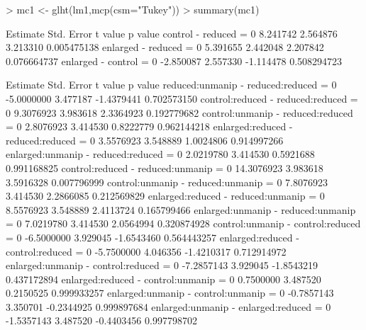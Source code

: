 \documentclass[a4paper]{article}
\begin{document}
\begin{Schunk}
\begin{Sinput}
> mc1 <- glht(lm1,mcp(csm="Tukey"))
> summary(mc1)
\end{Sinput}
\end{Schunk}
\begin{Schunk}
\begin{Soutput}
                        Estimate Std. Error   t value     p value
control - reduced = 0   8.241742   2.564876  3.213310 0.005475138
enlarged - reduced = 0  5.391655   2.442048  2.207842 0.076664737
enlarged - control = 0 -2.850087   2.557330 -1.114478 0.508294723
\end{Soutput}
\end{Schunk}
\begin{Schunk}
\end{Schunk}
\begin{Schunk}
\begin{Soutput}
                                          Estimate Std. Error    t value     p value
reduced:unmanip - reduced:reduced = 0   -5.0000000   3.477187 -1.4379441 0.702573150
control:reduced - reduced:reduced = 0    9.3076923   3.983618  2.3364923 0.192779682
control:unmanip - reduced:reduced = 0    2.8076923   3.414530  0.8222779 0.962144218
enlarged:reduced - reduced:reduced = 0   3.5576923   3.548889  1.0024806 0.914997266
enlarged:unmanip - reduced:reduced = 0   2.0219780   3.414530  0.5921688 0.991168825
control:reduced - reduced:unmanip = 0   14.3076923   3.983618  3.5916328 0.007796999
control:unmanip - reduced:unmanip = 0    7.8076923   3.414530  2.2866085 0.212569829
enlarged:reduced - reduced:unmanip = 0   8.5576923   3.548889  2.4113724 0.165799466
enlarged:unmanip - reduced:unmanip = 0   7.0219780   3.414530  2.0564994 0.320874928
control:unmanip - control:reduced = 0   -6.5000000   3.929045 -1.6543460 0.564443257
enlarged:reduced - control:reduced = 0  -5.7500000   4.046356 -1.4210317 0.712914972
enlarged:unmanip - control:reduced = 0  -7.2857143   3.929045 -1.8543219 0.437172894
enlarged:reduced - control:unmanip = 0   0.7500000   3.487520  0.2150525 0.999933257
enlarged:unmanip - control:unmanip = 0  -0.7857143   3.350701 -0.2344925 0.999897684
enlarged:unmanip - enlarged:reduced = 0 -1.5357143   3.487520 -0.4403456 0.997798702
\end{Soutput}
\end{Schunk}
\end{document}
